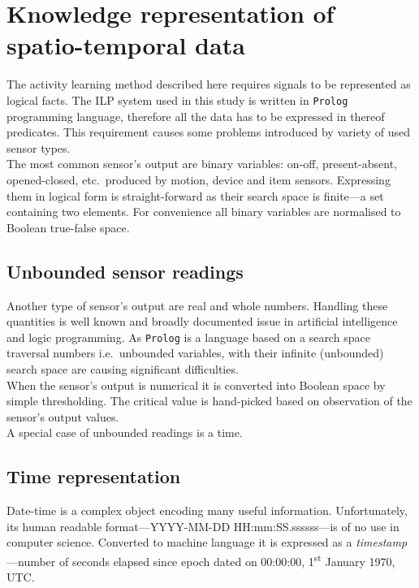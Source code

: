 \documentclass[10pt, a4paper, pdflatex, leqno, twoside, openright]{report}
\newcommand{\ts}{\textsuperscript}
\begin{document}
  \section{Knowledge representation of spatio-temporal data}
The activity learning method described here requires signals to be represented as logical facts. The ILP system used in this study is written in \texttt{Prolog} programming language, therefore all the data has to be expressed in thereof predicates. This requirement causes some problems introduced by variety of used sensor types.\\

The most common sensor's output are binary variables: on-off, present-absent, opened-closed, etc.\ produced by motion, device and item sensors. Expressing them in logical form is straight-forward as their search space is finite---a set containing two elements. For convenience all binary variables are normalised to Boolean true-false space.

    \subsection{Unbounded sensor readings}
Another type of sensor's output are real and whole numbers. Handling these quantities is well known and broadly documented issue in artificial intelligence and logic programming. As \texttt{Prolog} is a language based on a search space traversal numbers i.e.\ unbounded variables, with their infinite (unbounded) search space are causing significant difficulties.\\

When the sensor's output is numerical it is converted into Boolean space by simple thresholding. The critical value is hand-picked based on observation of the sensor's output values.\\
A special case of unbounded readings is a time.

    \subsection{Time representation\label{sec:timeRepresentation}}
Date-time is a complex object encoding many useful information. Unfortunately, its human readable format---YYYY-MM-DD HH:mm:SS.ssssss---is of no use in computer science. Converted to machine language it is expressed as a \emph{timestamp}---number of seconds elapsed since epoch dated on 00:00:00, 1\ts{st} January 1970, UTC.\\
\end{document}
